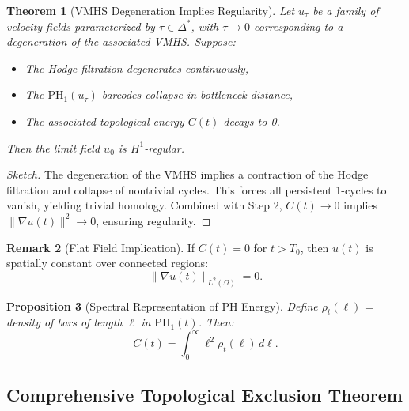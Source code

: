 \documentclass[11pt]{article}
\newtheorem{theorem}{Theorem}[section]
\newtheorem{proposition}[theorem]{Proposition}
\theoremstyle{definition}
\newtheorem{remark}[theorem]{Remark}
\begin{document}
\begin{theorem}[VMHS Degeneration Implies Regularity]
Let $u_\tau$ be a family of velocity fields parameterized by $\tau \in \Delta^*$, with $\tau \to 0$ corresponding to a degeneration of the associated VMHS. Suppose:
\begin{itemize}
    \item The Hodge filtration degenerates continuously,
    \item The $\mathrm{PH}_1(u_\tau)$ barcodes collapse in bottleneck distance,
    \item The associated topological energy $C(t)$ decays to 0.
\end{itemize}
Then the limit field $u_0$ is $H^1$-regular.
\end{theorem}

\begin{proof}[Sketch]
The degeneration of the VMHS implies a contraction of the Hodge filtration and collapse of nontrivial cycles. This forces all persistent 1-cycles to vanish, yielding trivial homology. Combined with Step 2, $C(t) \to 0$ implies $\|\nabla u(t)\|^2 \to 0$, ensuring regularity.
\end{proof}

\begin{remark}[Flat Field Implication]
If $C(t) = 0$ for $t > T_0$, then $u(t)$ is spatially constant over connected regions:
\[
\|\nabla u(t)\|_{L^2(\Omega)} = 0.
\]
\end{remark}

\begin{proposition}[Spectral Representation of PH Energy]
Define $\rho_t(\ell)$ = density of bars of length $\ell$ in $\mathrm{PH}_1(t)$. Then:
\[
C(t) = \int_0^\infty \ell^2 \rho_t(\ell) \, d\ell.
\]
\end{proposition}

\subsection*{Comprehensive Topological Exclusion Theorem}
\end{document}
